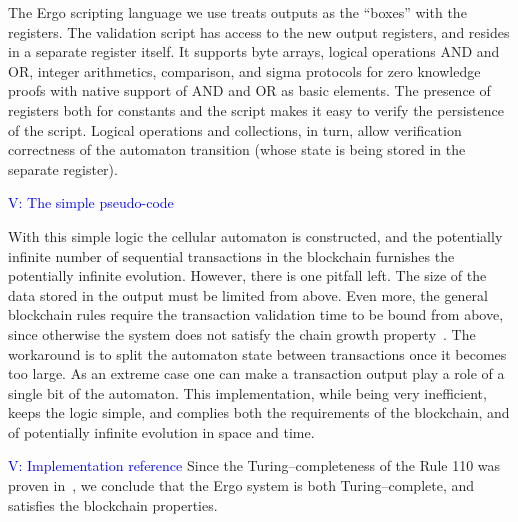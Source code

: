 \documentclass[runningheads]{llncs}
\newcommand{\vk}[1]{\textcolor{blue}{V: {#1}}}
\begin{document}
    The Ergo scripting language we use treats outputs as the ``boxes'' with the
    registers. The validation script has access to the new output registers, and
    resides in a separate register itself. It supports byte arrays, logical
    operations AND and OR, integer arithmetics, comparison, and sigma protocols
    for zero knowledge proofs with native support of AND and OR as basic
    elements. The presence of registers both for constants and the script makes
    it easy to verify the persistence of the script. Logical operations and
    collections, in turn, allow verification correctness of the automaton
    transition (whose state is being stored in the separate register).

    \vk{The simple pseudo-code}

    With this simple logic the cellular automaton is constructed, and the
    potentially infinite number of sequential transactions in the blockchain
    furnishes the potentially infinite evolution. However, there is one pitfall
    left. The size of the data stored in the output must be limited from above.
    Even more, the general blockchain rules require the transaction validation
    time to be bound from above, since otherwise the system does not satisfy the
    chain growth property~\cite{garay2015bitcoin}. The workaround is to split
    the automaton state between transactions once it becomes too large. As an
    extreme case one can make a transaction output play a role of a single bit
    of the automaton. This implementation, while being very inefficient, keeps
    the logic simple, and complies both the requirements of the blockchain, and
    of potentially infinite evolution in space and time.

    \vk{Implementation reference}
    Since the Turing--completeness of the Rule 110 was proven
    in~\cite{cook2004universality}, we conclude that the Ergo system is
    both Turing--complete, and satisfies the blockchain properties.
\end{document}
